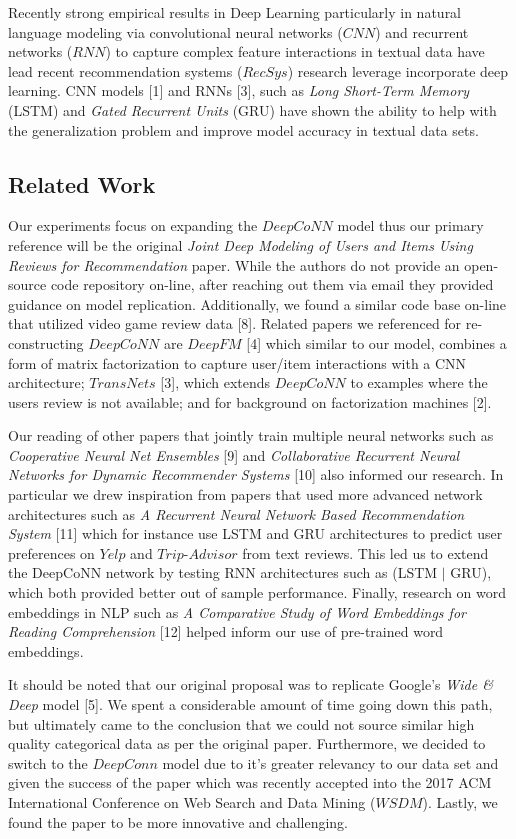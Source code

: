 \documentclass[10pt,twocolumn,letterpaper]{article}
\begin{document}
\par Recently strong empirical results in Deep Learning particularly in natural language modeling via convolutional neural networks ($CNN$) and recurrent networks ($RNN$) to capture complex feature interactions in textual data have lead recent recommendation systems ($RecSys$) research leverage incorporate deep learning. CNN models [1] and RNNs [3], such as \textit{Long Short-Term Memory} (LSTM) and \textit{Gated Recurrent Units} (GRU) have shown the ability to help with the generalization problem and improve model accuracy in textual data sets.

\subsection{Related Work}
Our experiments focus on expanding the $DeepCoNN$ model thus our primary reference will be the original \textit{Joint Deep Modeling of Users and Items Using Reviews for Recommendation} paper. While the authors do not provide an open-source code repository on-line, after reaching out them via email they provided guidance on model replication. Additionally, we found a similar code base on-line that utilized video game review data [8]. Related papers we referenced for re-constructing $DeepCoNN$ are $DeepFM$ [4] which similar to our model, combines a form of matrix factorization to capture user/item interactions with a CNN architecture; $TransNets$ [3], which extends $DeepCoNN$ to examples where the users review is not available; and for background on factorization machines [2]. 

Our reading of other papers that jointly train multiple neural networks such as \textit{Cooperative Neural Net Ensembles} [9] and \textit{Collaborative Recurrent Neural Networks for Dynamic Recommender Systems} [10] also informed our research. In particular we drew inspiration from papers that used more advanced network architectures such as  \textit{A Recurrent Neural Network Based Recommendation System} [11] which for instance use LSTM and GRU architectures to predict user preferences on $Yelp$ and $Trip$-$Advisor$ from text reviews. This led us to extend the DeepCoNN network by testing RNN architectures such as (LSTM $|$ GRU), which both provided better out of sample performance. Finally, research on word embeddings in NLP such as \textit{A Comparative Study of Word Embeddings for Reading Comprehension} [12] helped inform our use of pre-trained word embeddings. 

It should be noted that our original proposal was to replicate Google's \textit{Wide \& Deep} model [5]. We spent a considerable amount of time going down this path, but ultimately came to the conclusion that we could not source similar high quality categorical data as per the original paper. Furthermore, we decided to switch to the $DeepConn$ model due to it's greater relevancy to our data set and given the success of the paper which was recently accepted into the 2017 ACM International Conference on Web Search and Data Mining ($WSDM$). Lastly, we found the paper to be more innovative and challenging.
\end{document}
